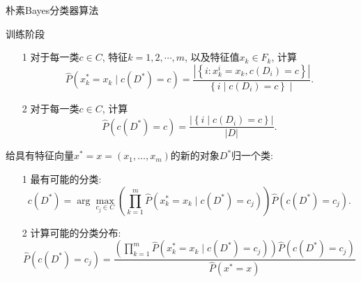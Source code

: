 \begin{algorithm}
    \caption{朴素Bayes分类器算法}
    \label{algo:Bayes-class}

    训练阶段
    \begin{itemize}
        \item [1] 对于每一类$c\in C$, 特征$k=1,2,\cdots, m$, 以及特征值$x_k\in F_k$, 计算$$
        \hat{P}\left(x_k^*=x_k \mid c\left(D^*\right)=c\right)=\frac{\left|\left\{i: x_k^i=x_k, c\left(D_i\right)=c\right\}\right|}{\left\{i \mid c\left(D_i\right)=c\right\} \mid} .
        $$
        \item [2] 对于每一类$c\in C$, 计算$$
        \hat{P}\left(c\left(D^*\right)=c\right)=\frac{\left|\left\{i \mid c\left(D_i\right)=c\right\}\right|}{|D|} .
        $$
    \end{itemize}

    给具有特征向量$x^*=x=\left(x_1, \ldots, x_m\right)$的新的对象$D^*$归一个类: 
    \begin{itemize}
        \item [1] 最有可能的分类: $$c\left(D^*\right)=\arg \max _{c_j \in C}\left(\prod_{k=1}^m \hat{P}\left(x_k^*=x_k \mid c\left(D^*\right)=c_j\right)\right) \hat{P}\left(c\left(D^*\right)=c_j\right) .$$
        \item [2] 计算可能的分类分布:$$\hat{P}\left(c\left(D^*\right)=c_j\right)=\frac{\left(\prod_{k=1}^m \hat{P}\left(x_k^*=x_k \mid c\left(D^*\right)=c_j\right)\right) \hat{P}\left(c\left(D^*\right)=c_j\right)}{\hat{P}\left(x^*=x\right)}$$
    \end{itemize}
\end{algorithm}
